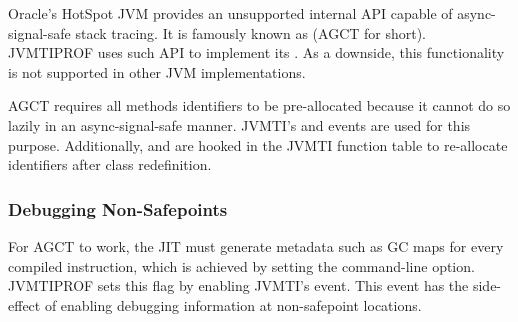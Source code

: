 Oracle's HotSpot JVM provides an unsupported internal API capable of async-signal-safe stack tracing. It is famously known as  (AGCT for short). JVMTIPROF uses such API to implement its . As a downside, this functionality is not supported in other JVM implementations.

AGCT requires all methods identifiers to be pre-allocated because it cannot do so lazily in an async-signal-safe manner. JVMTI's  and  events are used for this purpose. Additionally,  and  are hooked in the JVMTI function table to re-allocate identifiers after class redefinition.

\subsubsection*{Debugging Non-Safepoints}

For AGCT to work, the JIT must generate metadata such as GC maps for every compiled instruction, which is achieved by setting the  command-line option. JVMTIPROF sets this flag by enabling JVMTI's  event. This event has the side-effect of enabling debugging information at non-safepoint locations.
